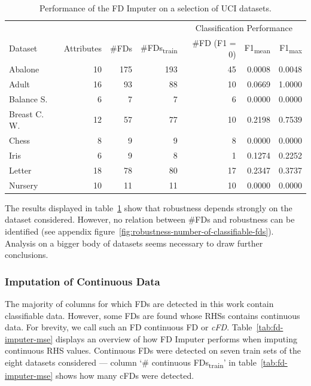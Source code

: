\begin{table}[ht]
    \centering
    \begin{tabular}{lrrrrrr}
        \toprule
        \toprule
        & & & & \multicolumn{3}{c}{Classification Performance} \\
        \cmidrule(lr{.25em}){5-7}
        Dataset & Attributes & \#FDs & \#FDs\textsubscript{train} & \#FD (F1 = 0) & F1\textsubscript{mean} & F1\textsubscript{max} \\
        \midrule
        Abalone & 10 & 175 & 193 & 45 & 0.0008 & 0.0048 \\
        Adult & 16 & 93 & 88 & 10 & 0.0669 & 1.0000 \\
        Balance S. & 6 & 7 & 7 & 6 & 0.0000 & 0.0000 \\
        Breast C. W. & 12 & 57 & 77 & 10 & 0.2198 & 0.7539 \\
        Chess & 8 & 9 & 9 & 8 & 0.0000 & 0.0000 \\
        Iris & 6 & 9 & 8 & 1 & 0.1274 & 0.2252 \\
        Letter & 18 & 78 & 80 & 17 & 0.2347 & 0.3737 \\
        Nursery & 10 & 11 & 11 & 10 & 0.0000 & 0.0000  \\
        \bottomrule
        \bottomrule
    \end{tabular}
    \caption{Performance of the FD Imputer on a selection of UCI datasets.}\label{tab:fd-imputer-performance}
\end{table}

The results displayed in table~\ref{tab:fd-imputer-performance} show that robustness depends strongly on the dataset considered.
However, no relation between \#FDs and robustness can be identified (see appendix figure~\ref{fig:robustness-number-of-classifiable-fds}).
Analysis on a bigger body of datasets seems necessary to draw further conclusions.

\subsubsection{Imputation of Continuous Data}
The majority of columns for which FDs are detected in this work contain classifiable data.
However, some FDs are found whose RHSs contains continuous data.
For brevity, we call such an FD continuous FD or \emph{cFD}.
Table~\ref{tab:fd-imputer-mse} displays an overview of how FD Imputer performs when imputing continuous RHS values.
Continuous FDs were detected on seven train sets of the eight datasets considered --- column `\# continuous FDs\textsubscript{train}' in table~\ref{tab:fd-imputer-mse} shows how many cFDs were detected.

